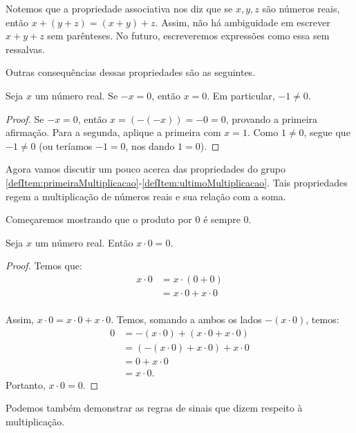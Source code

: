 Notemos que a propriedade associativa nos diz que se $x, y, z$ são números reais, então $x+(y+z)=(x+y)+z$.
Assim, não há ambiguidade em escrever $x+y+z$ sem parênteses.
No futuro, escreveremos expressões como essa sem ressalvas.

Outras consequências dessas propriedades são as seguintes.
\begin{proposition}
    Seja $x$ um número real.
    Se $-x=0$, então $x=0$.
    Em particular, $-1\neq 0$.
\end{proposition}
\begin{proof}
    Se $-x=0$, então $x=(-(-x))=-0=0$, provando a primeira afirmação.
    Para a segunda, aplique a primeira com $x=1$.
    Como $1\neq 0$, segue que $-1\neq 0$ (ou teríamos $-1=0$, nos dando $1=0$).
\end{proof}

Agora vamos discutir um pouco acerca das propriedades do grupo \ref{defItem:primeiraMultiplicacao}-\ref{defItem:ultimoMultiplicacao}.
Tais propriedades regem a multiplicação de números reais e sua relação com a soma.

Começaremos mostrando que o produto por $0$ é sempre $0$.

\begin{proposition}
Seja $x$ um número real.
Então $x\cdot 0=0$.
\end{proposition}
\begin{proof}
    Temos que:
    \begin{align*}
    x\cdot 0 &= x\cdot (0+0) \tag{0 é neutro da soma} \\
    &= x\cdot 0 + x\cdot 0 \tag{propriedade distributiva} \\
    \end{align*}

    Assim, $x\cdot 0 = x\cdot 0 + x\cdot 0$.
    Temos, somando a ambos os lados $-(x\cdot 0)$, temos:
    \begin{align*}
    0 &= -(x\cdot 0) + (x\cdot 0 + x\cdot 0) \tag{pela propriedade do oposto $-(x\cdot 0)$} \\
    &= (-(x\cdot 0) + x\cdot 0) + x\cdot 0 \tag{propriedade associativa} \\
    &= 0 + x\cdot 0 \tag{pela definição de oposto} \\
    &= x\cdot 0. \tag{0 é neutro da soma}
    \end{align*}
    Portanto, $x\cdot 0=0$.
\end{proof}

Podemos também demonstrar as regras de sinais que dizem respeito à multiplicação.


